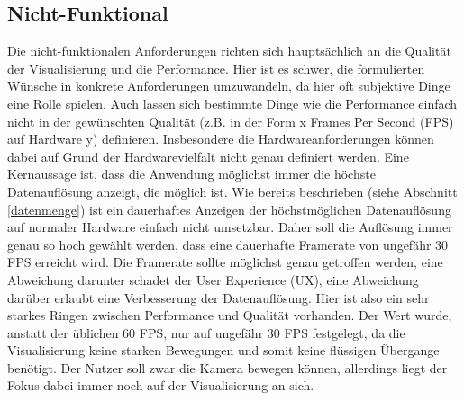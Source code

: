 



\subsection{Nicht-Funktional}
Die nicht-funktionalen Anforderungen richten sich hauptsächlich an die Qualität der Visualisierung und die Performance. Hier ist es schwer, die formulierten Wünsche in konkrete Anforderungen umzuwandeln, da hier oft subjektive Dinge eine Rolle spielen. Auch lassen sich bestimmte Dinge wie die Performance einfach nicht in der gewünschten Qualität (z.B. in der Form x Frames Per Second (FPS) auf Hardware y) definieren. Insbesondere die Hardwareanforderungen können dabei auf Grund der Hardwarevielfalt nicht genau definiert werden. Eine Kernaussage ist, dass die Anwendung möglichst immer die höchste Datenauflösung anzeigt, die möglich ist. Wie bereits beschrieben (siehe Abschnitt \ref{datenmenge}) ist ein dauerhaftes Anzeigen der höchstmöglichen Datenauflösung auf normaler Hardware einfach nicht umsetzbar. Daher soll die Auflösung immer genau so hoch gewählt werden, dass eine dauerhafte Framerate von ungefähr 30 FPS erreicht wird. Die Framerate sollte möglichst genau getroffen werden, eine Abweichung darunter schadet der User Experience (UX), eine Abweichung darüber erlaubt eine Verbesserung der Datenauflösung. Hier ist also ein sehr starkes Ringen zwischen Performance und Qualität vorhanden. Der Wert wurde, anstatt der üblichen 60 FPS, nur auf ungefähr 30 FPS festgelegt, da die Visualisierung keine starken Bewegungen und somit keine flüssigen Übergange benötigt. Der Nutzer soll zwar die Kamera bewegen können, allerdings liegt der Fokus dabei immer noch auf der Visualisierung an sich.

